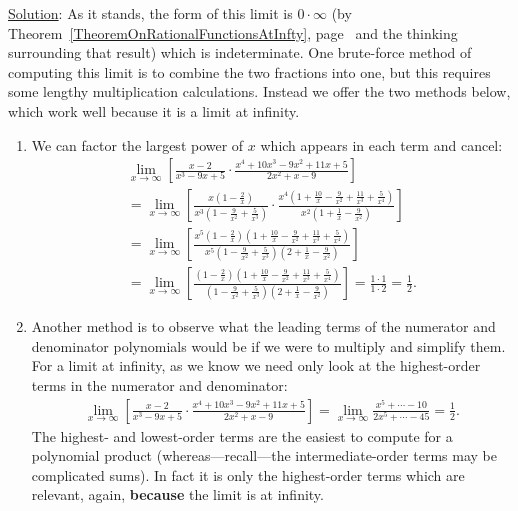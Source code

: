 \underline{Solution}: As it stands, the form of this limit
is $0\cdot\infty$ (by 
Theorem~\ref{TheoremOnRationalFunctionsAtInfty},  
page~\pageref{TheoremOnRationalFunctionsAtInfty}
and the thinking surrounding that result)
which is indeterminate. One brute-force method
of computing this limit is to combine the two fractions into
one, but this requires some lengthy multiplication calculations.
Instead we offer the two methods below, which work well
because it is a limit at infinity.
\begin{enumerate}
\item We can factor the largest power of $x$ which appears in
each term and cancel:
\begin{multline*}
\lim_{x\to\infty}\left[
            \frac{x-2}{x^3-9x+5}\cdot\frac{x^4+10x^3-9x^2+11x+5}
{2x^2+x-9}\right]\\
  =\lim_{x\to\infty}\left[\frac{x\left(1-\frac2x\right)}{x^3
         \left(1-\frac9{x^2}+\frac5{x^3}\right)}\cdot
         \frac{x^4\left(1+\frac{10}x-\frac{9}{x^2}+\frac{11}{x^3}+
                 \frac5{x^4}\right)}{x^2\left(1+\frac1x-\frac{9}{x^2}
                \right)}\right]\\
 =\lim_{x\to\infty}\left[\frac{x^5\left(1-\frac2x\right)
                                  \left(1+\frac{10}x-\frac{9}{x^2}+
                                  \frac{11}{x^3}+\frac5{x^4}\right)}
                     {x^5\left(1-\frac9{x^2}+\frac5{x^3}\right)
                      \left(2+\frac1x-\frac{9}{x^2}\right)}\right]\\
=\lim_{x\to\infty}\left[\frac{\left(1-\frac2x\right)
                                  \left(1+\frac{10}x-\frac{9}{x^2}+
                                  \frac{11}{x^3}+\frac5{x^4}\right)}
                     {\left(1-\frac9{x^2}+\frac5{x^3}\right)
                      \left(2+\frac1x-\frac{9}{x^2}\right)}\right]
=\frac{1\cdot1}{1\cdot2}=\frac12.
\end{multline*}
\item Another method is to observe what the leading terms of the
      numerator and denominator polynomials would be if we were
      to multiply and simplify them.  For a limit at infinity, as
      we know we need only look at the highest-order terms in the
      numerator and denominator:
\begin{multline*}
\lim_{x\to\infty}\left[
            \frac{x-2}{x^3-9x+5}\cdot\frac{x^4+10x^3-9x^2+11x+5}
{2x^2+x-9}\right]
 =\lim_{x\to\infty}\frac{x^5+\cdots-10}{2x^5+\cdots-45}=\frac12.
\end{multline*}
The highest- and lowest-order terms are the easiest to compute for
a polynomial product (whereas---recall---the intermediate-order terms may
be complicated sums).  In fact it is only the highest-order terms which
are relevant, again, {\bf because} the limit is at infinity.
\end{enumerate}

